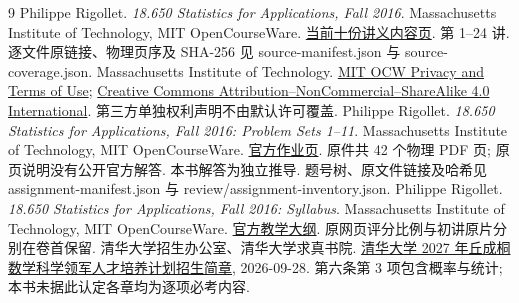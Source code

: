 \clearpage
\begin{thebibliography}{9}
 Philippe Rigollet. \textit{18.650 Statistics for Applications, Fall 2016}. Massachusetts Institute of Technology, MIT OpenCourseWare. \href{https://ocw.mit.edu/courses/18-650-statistics-for-applications-fall-2016/pages/lecture-slides/}{当前十份讲义内容页}. 第 1--24 讲. 逐文件原链接、物理页序及 SHA-256 见 source-manifest.json 与 source-coverage.json.
 Massachusetts Institute of Technology. \href{https://ocw.mit.edu/pages/privacy-and-terms-of-use/}{MIT OCW Privacy and Terms of Use}; \href{https://creativecommons.org/licenses/by-nc-sa/4.0/}{Creative Commons Attribution--NonCommercial--ShareAlike 4.0 International}. 第三方单独权利声明不由默认许可覆盖.
 Philippe Rigollet. \textit{18.650 Statistics for Applications, Fall 2016: Problem Sets 1--11}. Massachusetts Institute of Technology, MIT OpenCourseWare. \href{https://ocw.mit.edu/courses/18-650-statistics-for-applications-fall-2016/pages/assignments/}{官方作业页}. 原件共 42 个物理 PDF 页; 原页说明没有公开官方解答. 本书解答为独立推导. 题号树、原文件链接及哈希见 assignment-manifest.json 与 review/assignment-inventory.json.
 Philippe Rigollet. \textit{18.650 Statistics for Applications, Fall 2016: Syllabus}. Massachusetts Institute of Technology, MIT OpenCourseWare. \href{https://ocw.mit.edu/courses/18-650-statistics-for-applications-fall-2016/pages/syllabus/}{官方教学大纲}. 原网页评分比例与初讲原片分别在卷首保留.
 清华大学招生办公室、清华大学求真书院. \href{https://www.admissions.tsinghua.edu.cn/info/1033/2240.htm}{清华大学 2027 年丘成桐数学科学领军人才培养计划招生简章}, 2026-09-28. 第六条第 3 项包含概率与统计; 本书未据此认定各章均为逐项必考内容.
\end{thebibliography}
